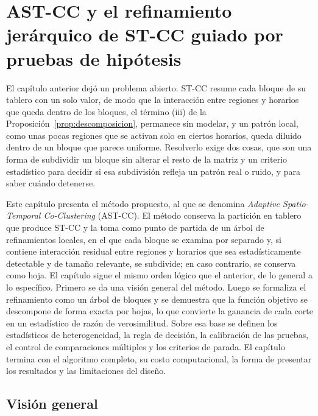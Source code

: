 
\chapter{AST-CC y el refinamiento jerárquico de ST-CC guiado por pruebas de hipótesis}\label{chap:propuesta}

El capítulo anterior dejó un problema abierto. ST-CC resume cada bloque de su
tablero con un solo valor, de modo que la interacción entre regiones y horarios
que queda dentro de los bloques, el término (iii) de la
Proposición~\ref{prop:descomposicion}, permanece sin modelar, y un patrón local,
como unas pocas regiones que se activan solo en ciertos horarios, queda diluido
dentro de un bloque que parece uniforme. Resolverlo exige dos cosas, que son una
forma de subdividir un bloque sin alterar el resto de la matriz y un criterio
estadístico para decidir si esa subdivisión refleja un patrón real o ruido, y para
saber cuándo detenerse.

Este capítulo presenta el método propuesto, al que se denomina \emph{Adaptive
Spatio-Temporal Co-Clustering} (AST-CC). El método conserva la partición en
tablero que produce ST-CC y la toma como punto de partida de un árbol de
refinamientos locales, en el que cada bloque se examina por separado y, si contiene
interacción residual entre regiones y horarios que sea estadísticamente
detectable y de tamaño relevante, se subdivide; en caso contrario, se conserva
como hoja. El capítulo sigue el mismo orden lógico que el anterior, de lo
general a lo específico. Primero se da una visión general del método. Luego se formaliza el
refinamiento como un árbol de bloques y se demuestra que la función objetivo se
descompone de forma exacta por hojas, lo que convierte la ganancia de cada corte
en un estadístico de razón de verosimilitud. Sobre esa base se definen los
estadísticos de heterogeneidad, la regla de decisión, la calibración de las
pruebas, el control de comparaciones múltiples y los criterios de parada. El
capítulo termina con el algoritmo completo, su costo computacional, la forma de
presentar los resultados y las limitaciones del diseño.

\section{Visión general}\label{sec:prop-vision}

